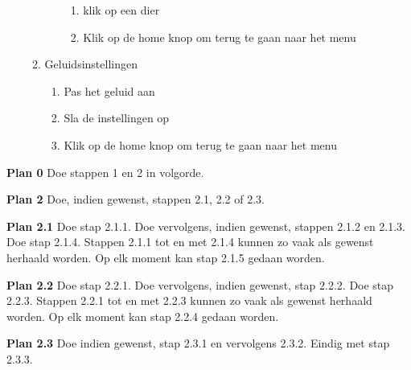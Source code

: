 \documentclass[12pt]{article}
\begin{document}
\begin{enumerate}
\begin{enumerate}[(1)]
\begin{enumerate}[1.]
\begin{enumerate}[(1)]
				\item klik op een dier
				\item Klik op de home knop om terug te gaan naar het menu
			\end{enumerate}
		\end{enumerate}
		\item Geluidsinstellingen
		\begin{enumerate}[1.]
			\item Pas het geluid aan
			\item Sla de instellingen op
			\item Klik op de home knop om terug te gaan naar het menu
		\end{enumerate}
	\end{enumerate}
\end{enumerate}

\textbf{Plan 0} Doe stappen 1 en 2 in volgorde.

\textbf{Plan 2} Doe, indien gewenst, stappen 2.1, 2.2 of 2.3.

\textbf{Plan 2.1} Doe stap 2.1.1. Doe vervolgens, indien gewenst, stappen 2.1.2 en 2.1.3. Doe stap 2.1.4. Stappen 2.1.1 tot en met 2.1.4 kunnen zo vaak als gewenst herhaald worden. Op elk moment kan stap 2.1.5 gedaan worden.

\textbf{Plan 2.2} Doe stap 2.2.1. Doe vervolgens, indien gewenst, stap 2.2.2. Doe stap 2.2.3. Stappen 2.2.1 tot en met 2.2.3 kunnen zo vaak als gewenst herhaald worden. Op elk moment kan stap 2.2.4 gedaan worden.

\textbf{Plan 2.3} Doe indien gewenst, stap 2.3.1 en vervolgens 2.3.2. Eindig met stap 2.3.3.
\end{document}
